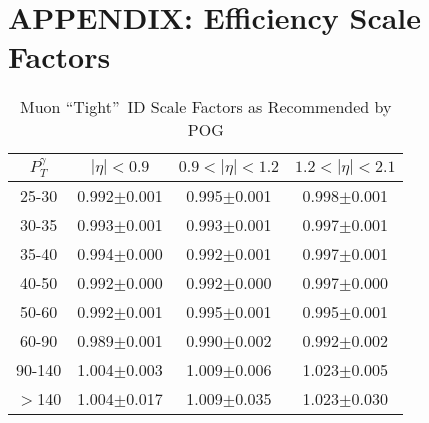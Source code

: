 \chapter{APPENDIX: Efficiency Scale Factors}
\label{sec:SFsTables}

\begin{table}[h]
  \footnotesize
  \begin{center}
  \caption{Muon ``Tight''~ID Scale Factors as Recommended by POG} 
   \begin{tabular}{|c|c|c|c|}
 $P_T^{\gamma}$  & $|\eta|< 0.9$   & $0.9<|\eta|< 1.2$    & $1.2<|\eta|< 2.1$ \\ \hline
25-30          & 0.992$\pm$0.001   & 0.995$\pm$0.001    & 0.998$\pm$0.001     \\ \hline
30-35          & 0.993$\pm$0.001   & 0.993$\pm$0.001    & 0.997$\pm$0.001        \\ \hline
35-40          & 0.994$\pm$0.000   & 0.992$\pm$0.001    & 0.997$\pm$0.001        \\ \hline
40-50          & 0.992$\pm$0.000   & 0.992$\pm$0.000    & 0.997$\pm$0.000        \\ \hline
50-60          & 0.992$\pm$0.001   & 0.995$\pm$0.001    & 0.995$\pm$0.001        \\ \hline
60-90          & 0.989$\pm$0.001   & 0.990$\pm$0.002    & 0.992$\pm$0.002        \\ \hline
90-140         & 1.004$\pm$0.003   & 1.009$\pm$0.006    & 1.023$\pm$0.005        \\ \hline
$>$140         & 1.004$\pm$0.017   & 1.009$\pm$0.035    & 1.023$\pm$0.030        \\ \hline
  \end{tabular}
  \label{tab:SFs_MuonIso}
  \end{center}
\end{table}

